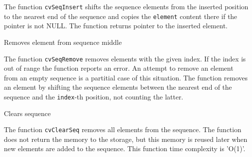 \begin{description}
\end{description}

The function \texttt{cvSeqInsert} shifts the sequence elements from the inserted position to the nearest end of the sequence and copies the \texttt{element} content there if the pointer is not NULL. The function returns pointer to the inserted element.

\label{SeqRemove}

Removes element from sequence middle


\begin{description}
\end{description}


The function \texttt{cvSeqRemove} removes elements with the given
index. If the index is out of range the function reports an error. An
attempt to remove an element from an empty sequence is a partitial
case of this situation. The function removes an element by shifting
the sequence elements between the nearest end of the sequence and the
\texttt{index}-th position, not counting the latter.


\label{ClearSeq}

Clears sequence


\begin{description}
\end{description}


The function \texttt{cvClearSeq} removes all elements from the
sequence. The function does not return the memory to the storage, but this
memory is reused later when new elements are added to the sequence. This
function time complexity is 'O(1)'.


